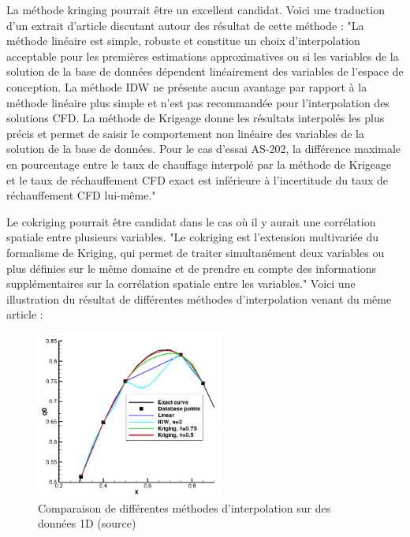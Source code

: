 La méthode kringing pourrait être un excellent candidat. Voici une traduction d'un extrait d'article discutant autour des résultat de cette méthode :
"La méthode linéaire est simple, robuste et constitue un choix d'interpolation acceptable pour les premières estimations approximatives ou si les variables de la solution de la base de données dépendent linéairement des variables de l'espace de conception. La méthode IDW ne présente aucun avantage par rapport à la méthode linéaire plus simple et n'est pas recommandée pour l'interpolation des solutions CFD. La méthode de Krigeage donne les résultats interpolés les plus précis et permet de saisir le comportement non linéaire des variables de la solution de la base de données. Pour le cas d'essai AS-202, la différence maximale en pourcentage entre le taux de chauffage interpolé par la méthode de Krigeage et le taux de réchauffement CFD exact est inférieure à l'incertitude du taux de réchauffement CFD lui-même."\cite{palmer2009}


Le cokriging pourrait être candidat dans le cas où il y aurait une corrélation spatiale entre plusieurs variables.
"Le cokriging est l'extension multivariée du formalisme de Kriging, qui permet de traiter simultanément deux variables ou plus définies sur le même domaine et de prendre en compte des informations supplémentaires sur la corrélation spatiale entre les variables."\cite{kringing}
Voici une illustration du résultat de différentes méthodes d'interpolation venant du même article :

\begin{figure}[H]
    \centering
    \includegraphics[width=0.55\textwidth]{images/palmer2009_comp_copie.png}
    \caption{Comparaison de différentes méthodes d'interpolation sur des données 1D (source\cite{palmer2009})}
    \label{fig:compar}
\end{figure}

